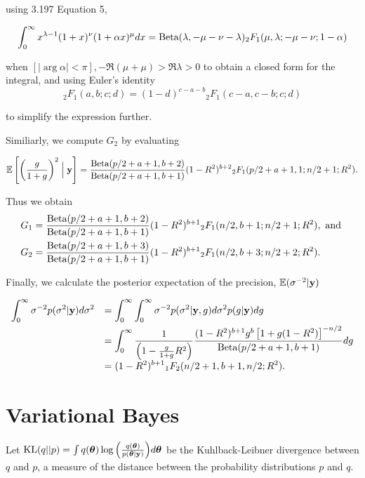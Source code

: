 \documentclass{amsart}[12pt]
\begin{document}
using \cite{Gradshteyn1988} 3.197 Equation 5,

\[
	\int_0^\infty x^{\lambda-1} (1+x)^\nu (1 + \alpha x)^{\mu} dx = \text{Beta}(\lambda, -\mu-\nu-\lambda) {}_2 F_1 (\mu, \lambda; -\mu-\nu; 1 - \alpha)
\]

when $[|\arg \alpha| < \pi], -\Re(\mu + \mu) > \Re \lambda > 0$ to obtain a closed form for the integral,  and
using Euler's identity
\[
	{}_2 F_1(a, b; c; d) = (1 - d)^{c - a -  b} {}_2 F_1(c - a, c - b; c; d)
\]

to simplify the expression further.

Similiarly, we compute $G_2$ by evaluating

\[
	\mathbb{E}\left[ \left(\frac{g}{1 + g} \right)^2 \Bigm| {\bf y} \right] = \frac{\text{Beta}(p/2 + a + 1, b + 2)}{\text{Beta}(p /2 + a + 1, b + 1)} (1 - R^2)^{b+2} {}_2 F_1(p/2 + a + 1, 1; n/2 + 1; R^2).
\]

Thus we obtain
\begin{align*}
	G_1 & = \frac{\text{Beta}(p/2 + a + 1, b + 2)}{\text{Beta}(p /2 + a + 1, b + 1)} (1 - R^2)^{b+1} {}_2 F_1(n/2, b + 1; n/2 + 1; R^2), \text{ and } \\
	G_2 & = \frac{\text{Beta}(p/2 + a + 1, b + 3)}{\text{Beta}(p /2 + a + 1, b + 1)} (1 - R^2)^{b+1} {}_2 F_1(n/2, b + 3; n/2 + 2; R^2).              
\end{align*}

Finally, we calculate the posterior expectation of the precision, $\mathbb{E}(\sigma^{-2}|{\bf y})$

$$
\begin{array}{rl}
	\displaystyle \int_0^\infty \sigma^{-2} p(\sigma^2|{\bf y}) d\sigma^2 
	  & \displaystyle = \int_0^\infty \int_0^\infty \sigma^{-2} p(\sigma^2|{\bf y},g) d\sigma^2 p(g|{\bf y}) dg 
	\\ [2ex]
	  & \displaystyle =  \int_0^\infty \frac{1}{\left(                                                  
	1 -
	\tfrac{g}{1+g} R^2\right)} \frac{(1 -  R^2)^{b+1} g^{b} \left[  1 + g(1 -  R^2) \right]^{-n/2}}{\mbox{Beta}(p/2 + a + 1,b+1)} dg
	\\ [2ex]
	  & \displaystyle =  (1 -  R^2)^{b+1}                                                               
	{}_1 F_2(n/2+1,b+1,n/2;R^2)  .
\end{array}
$$

\section{Variational Bayes}
\label{sec:vb}

Let $\text{KL}(q||p) = \int q({\boldsymbol \theta}) \log{\left( \frac{q({\boldsymbol\theta})}{p({\boldsymbol\theta}|{\bf y})} \right)} d {\boldsymbol \theta}$ be the
Kuhlback-Leibner divergence between $q$ and $p$, a measure of the distance between the probability
distributions $p$ and $q$.
\end{document}

